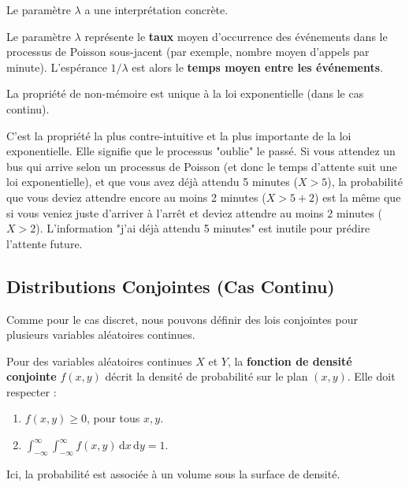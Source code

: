 Le paramètre $\lambda$ a une interprétation concrète.

\begin{remarquebox}
Le paramètre $\lambda$ représente le \textbf{taux} moyen d'occurrence des événements dans le processus de Poisson sous-jacent (par exemple, nombre moyen d'appels par minute). L'espérance $1/\lambda$ est alors le \textbf{temps moyen entre les événements}.
\end{remarquebox}

La propriété de non-mémoire est unique à la loi exponentielle (dans le cas continu).

\begin{intuitionbox}
C'est la propriété la plus contre-intuitive et la plus importante de la loi exponentielle. Elle signifie que le processus "oublie" le passé. Si vous attendez un bus qui arrive selon un processus de Poisson (et donc le temps d'attente suit une loi exponentielle), et que vous avez déjà attendu 5 minutes ($X>5$), la probabilité que vous deviez attendre encore au moins 2 minutes ($X>5+2$) est la même que si vous veniez juste d'arriver à l'arrêt et deviez attendre au moins 2 minutes ($X>2$). L'information "j'ai déjà attendu 5 minutes" est inutile pour prédire l'attente future.
\end{intuitionbox}

\subsection{Distributions Conjointes (Cas Continu)}

Comme pour le cas discret, nous pouvons définir des lois conjointes pour plusieurs variables aléatoires continues.

\begin{definitionbox}
Pour des variables aléatoires continues $X$ et $Y$, la \textbf{fonction de densité conjointe} $f(x, y)$ décrit la densité de probabilité sur le plan $(x, y)$. Elle doit respecter :
\begin{enumerate}
    \item $f(x, y) \ge 0$, pour tous $x, y$.
    \item $\int_{-\infty}^{\infty} \int_{-\infty}^{\infty} f(x, y) \, \mathrm{d}x \, \mathrm{d}y = 1$.
\end{enumerate}
\end{definitionbox}

Ici, la probabilité est associée à un volume sous la surface de densité.

